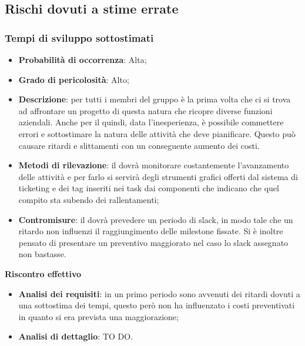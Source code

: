 	
	\subsection{Rischi dovuti a stime errate} %
	\label{sub:rischi_dovuti_a_stime_errate}
		\subsubsection{Tempi di sviluppo sottostimati} %
		\label{ssub:tempi_di_sviluppo_sottostimati}
			\begin{itemize}
				\item \textbf{Probabilità di occorrenza}: Alta;
				\item \textbf{Grado di pericolosità}: Alto;
				\item \textbf{Descrizione}: per tutti i membri del gruppo è la prima volta che ci si trova ad affrontare un progetto di questa natura che ricopre diverse funzioni aziendali. Anche per il \roleProjectManager{} quindi, data l'inesperienza, è possibile commettere errori e sottostimare la natura delle attività che deve pianificare. Questo può causare ritardi e slittamenti con un conseguente aumento dei costi.
				\item \textbf{Metodi di rilevazione}: il \roleProjectManager{} dovrà monitorare costantemente l'avanzamento delle attività e per farlo si servirà degli strumenti grafici offerti dal sistema di ticketing e dei tag inseriti nei task dai componenti che indicano che quel compito sta subendo dei rallentamenti;
				\item \textbf{Contromisure}: il \roleProjectManager{} dovrà prevedere un periodo di slack, in modo tale che un ritardo non influenzi il raggiungimento delle milestone fissate. Si è inoltre pensato di presentare un preventivo maggiorato nel caso lo slack assegnato non bastasse.
			\end{itemize}
		\noindent
		\textbf{Riscontro effettivo}
			\begin{itemize}
				\item \textbf{Analisi dei requisiti}: in un primo periodo sono avvenuti dei ritardi dovuti a una sottostima dei tempi, questo però non ha influenzato i costi preventivati in quanto si era prevista una maggiorazione;
				\item \textbf{Analisi di dettaglio}: TO DO.
			\end{itemize}




